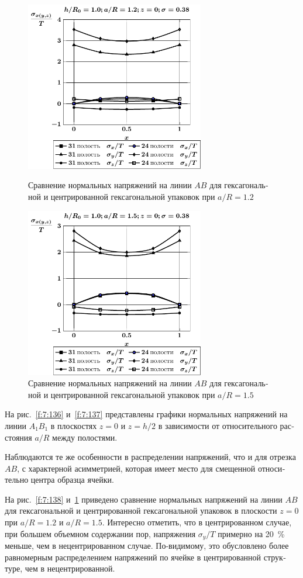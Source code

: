 \begin{russian}
\begin{figure}[h!]
\centering\footnotesize
\parbox[b]{7.5cm}{\centering\includegraphics[width=7.8cm]{cav31-24-a12-h10-r10-z0.pdf}
\caption{Сравнение нормальных напряжений на линии $AB$ для гексагональной и центрированной гексагональной упаковок при $a/R=1.2$
\label{f:7:138}}}\hfil\hfil
\parbox[b]{7.5cm}{\centering\includegraphics[width=7.8cm]{cav31-24-a15-h10-r10-z0.pdf}
\caption{Сравнение нормальных напряжений на линии $AB$ для гексагональной и центрированной гексагональной упаковок при $a/R=1.5$
\label{f:7:139}}}
\end{figure}

На рис.~\ref{f:7:136} и~\ref{f:7:137} представлены графики нормальных напряжений на линии $A_1B_1$ в плоскостях $z=0$ и $z=h/2$ в зависимости от относительного расстояния $a/R$ между полостями.

Наблюдаются те же особенности в распределении напряжений, что и для отрезка $AB$, с характерной асимметрией, которая имеет место для смещенной относительно центра образца ячейки.

На рис.~\ref{f:7:138} и~\ref{f:7:139} приведено сравнение нормальных напряжений на линии $AB$ для гексагональной и центрированной гексагональной упаковок в плоскости $z=0$ при $a/R=1.2$ и $a/R=1.5$. Интересно отметить, что в центрированном случае, при большем объемном содержании пор, напряжения $\sigma_y/T$ примерно на 20~\% меньше, чем в нецентрированном случае. По-видимому, это обусловлено более равномерным распределением напряжений по ячейке в центрированной структуре, чем в нецентрированной.


\end{russian}

